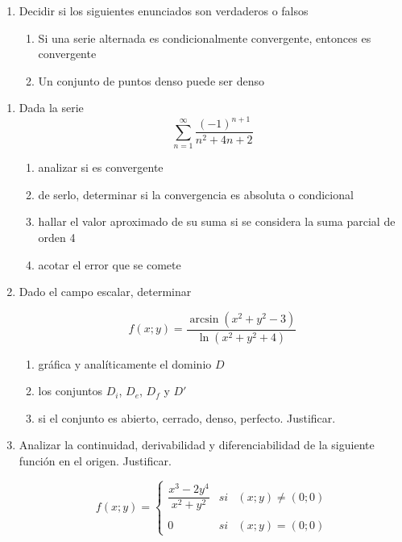\documentclass[9pt,a4paper]{extarticle}
\begin{document}
\begin{enumerate}
    \item Decidir si los siguientes enunciados son verdaderos o falsos
    \begin{enumerate}
        \item Si una serie alternada es condicionalmente convergente, entonces es convergente
        \item Un conjunto de puntos denso puede ser denso
    \end{enumerate}
    
\end{enumerate}


\newpage
{}


\begin{enumerate}
    \item Dada la serie
    \[
    \sum^\infty_{n=1} \dfrac{(-1)^{n+1}}{n^2+4n+2}
    \]
    \begin{enumerate}
        \item analizar si es convergente
        \item de serlo, determinar si la convergencia es absoluta o condicional
        \item hallar el valor aproximado de su suma si se considera la suma parcial de orden 4
        \item acotar el error que se comete
    \end{enumerate}
    
    \item Dado el campo escalar, determinar
    
    \[
    f(x;y)= \dfrac{\arcsin(x^2+y^2-3)}{\ln{(x^2+y^2+4)}}
    \]
    
    \begin{enumerate}
        \item gráfica y analíticamente el dominio $D$
        \item los conjuntos $D_i$, $D_e$, $D_f$ y $D'$
        \item si el conjunto es abierto, cerrado, denso, perfecto. Justificar.
    \end{enumerate}
    
    
    \item Analizar la continuidad, derivabilidad y diferenciabilidad de la siguiente función en el origen. Justificar.
    
    \[
    f(x;y)= \left\{ \begin{array}{lcc}
             \dfrac{x^3 - 2y^4}{x^2 + y^2} &   si  & (x;y) \neq (0;0) \\
             \\ 0 &  si & (x;y) = (0;0)
             \end{array}
   \right.
    \]
    

\end{enumerate}
\end{document}
